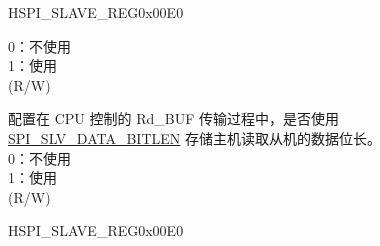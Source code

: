\begin{register}{H}{SPI\_SLAVE\_REG}{0x00E0}
\begin{regdesc}
\begin{reglist}
0：不使用 \\
1：使用 \\
(R/W)
\label{fielddesc:SPISLVRDBUFBITLENEN}\item [SPI\_SLV\_RDBUF\_BITLEN\_EN] 配置在 CPU 控制的 Rd\_BUF 传输过程中，是否使用 \hyperref[fielddesc:SPISLVDATABITLEN]{SPI\_SLV\_DATA\_BITLEN} 存储主机读取从机的数据位长。 \\
0：不使用 \\
1：使用 \\
(R/W)

\item [见下页...]
\end{reglist}\end{regdesc}
\end{register}

\addtocounter{Regfloat}{-1}
\begin{register}{H}{SPI\_SLAVE\_REG}{0x00E0}
\begin{regdesc}\begin{reglist}
\item [接上页...]


\end{reglist}
\end{regdesc}
\end{register}
